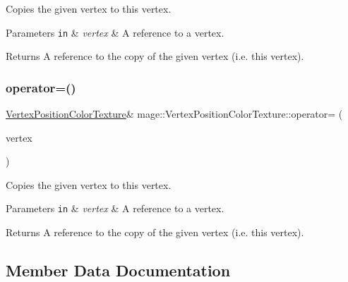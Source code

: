 Copies the given vertex to this vertex.


\begin{DoxyParams}[1]{Parameters}
\mbox{\tt in}  & {\em vertex} & A reference to a vertex. \\
\hline
\end{DoxyParams}
\begin{DoxyReturn}{Returns}
A reference to the copy of the given vertex (i.\+e. this vertex). 
\end{DoxyReturn}
\hypertarget{structmage_1_1_vertex_position_color_texture_a7f3b2f23f7ed7f4d228f352fb1e53bcd}{}\label{structmage_1_1_vertex_position_color_texture_a7f3b2f23f7ed7f4d228f352fb1e53bcd} 
\subsubsection{\texorpdfstring{operator=()}{operator=()}\hspace{0.1cm}{\footnotesize\ttfamily [2/2]}}
{\footnotesize\ttfamily \hyperlink{structmage_1_1_vertex_position_color_texture}{Vertex\+Position\+Color\+Texture}\& mage\+::\+Vertex\+Position\+Color\+Texture\+::operator= (\begin{DoxyParamCaption}\item[{\hyperlink{structmage_1_1_vertex_position_color_texture}{Vertex\+Position\+Color\+Texture} \&\&}]{vertex }\end{DoxyParamCaption})\hspace{0.3cm}{\ttfamily [default]}}

Copies the given vertex to this vertex.


\begin{DoxyParams}[1]{Parameters}
\mbox{\tt in}  & {\em vertex} & A reference to a vertex. \\
\hline
\end{DoxyParams}
\begin{DoxyReturn}{Returns}
A reference to the copy of the given vertex (i.\+e. this vertex). 
\end{DoxyReturn}


\subsection{Member Data Documentation}
\hypertarget{structmage_1_1_vertex_position_color_texture_afb9ec100ec42e83e501448d4bb0ee4f8}{}\label{structmage_1_1_vertex_position_color_texture_afb9ec100ec42e83e501448d4bb0ee4f8} 
